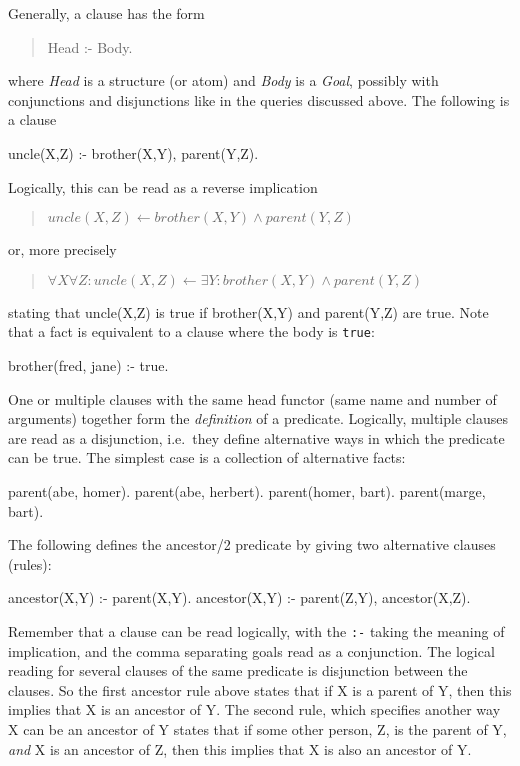      Generally, a clause has the form
     \begin{quote}
     Head :- Body.
     \end{quote}
     where {\em Head} is a structure (or atom) and {\em Body} is a {\em Goal},
     possibly with conjunctions and disjunctions like in the queries discussed above.
     The following is a clause
\begin{code}
uncle(X,Z) :- brother(X,Y), parent(Y,Z).
\end{code}
     Logically, this can be read as a reverse implication
     \begin{quote}
     $uncle(X,Z) \longleftarrow brother(X,Y) \wedge parent(Y,Z)$
     \end{quote}
     or, more precisely
     \begin{quote}
     $\forall X \forall Z: uncle(X,Z) \longleftarrow \exists Y: brother(X,Y) \wedge parent(Y,Z)$
     \end{quote}
     stating that uncle(X,Z) is true if brother(X,Y) and parent(Y,Z) are true.
     Note that a fact is equivalent to a clause where the body is {\tt true}:
\begin{code}
brother(fred, jane) :- true.
\end{code}

     One or multiple clauses with the same head functor (same name and number
     of arguments) together form the {\em definition}
     of a predicate. Logically, multiple clauses are read as a disjunction,
    i.e.\ they define alternative ways in which the predicate can be true.
     The simplest case is a collection of alternative facts:
\begin{code}
parent(abe, homer).
parent(abe, herbert).
parent(homer, bart).
parent(marge, bart).
\end{code}
The following defines the ancestor/2 predicate by giving two alternative
clauses (rules):
\begin{code}
ancestor(X,Y) :- parent(X,Y).
ancestor(X,Y) :- parent(Z,Y), ancestor(X,Z).
\end{code}
       Remember that a clause can be read logically, with the {\tt :-}
       taking the meaning of implication, and the comma
       separating goals read as a conjunction. The logical
       reading for several clauses of the same predicate is disjunction
       between the clauses. So the first
       ancestor rule above states that if X is a parent of Y, then this
       implies that X is an ancestor of Y. The second rule, which specifies
       another way X can be an ancestor of Y states that if some other
       person, Z, is the parent of Y, {\it and\/} X is an ancestor of Z,
       then this implies that X is also an ancestor of Y.


